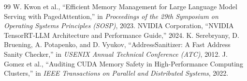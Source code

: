 \documentclass[11pt,a4paper]{article}
\begin{document}
\begin{thebibliography}{99}
 W. Kwon et al., ``Efficient Memory Management for Large Language Model Serving with PagedAttention,'' in \emph{Proceedings of the 29th Symposium on Operating Systems Principles (SOSP)}, 2023.
 NVIDIA Corporation, ``NVIDIA TensorRT-LLM Architecture and Performance Guide,'' 2024.
 K. Serebryany, D. Bruening, A. Potapenko, and D. Vyukov, ``AddressSanitizer: A Fast Address Sanity Checker,'' in \emph{USENIX Annual Technical Conference (ATC)}, 2012.
 J. Gomez et al., ``Auditing CUDA Memory Safety in High-Performance Computing Clusters,'' in \emph{IEEE Transactions on Parallel and Distributed Systems}, 2022.
\end{thebibliography}
\end{document}
